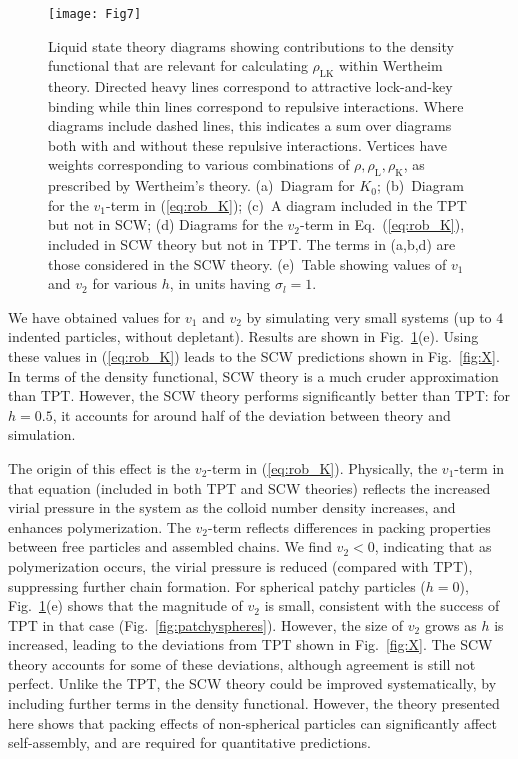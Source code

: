 \documentclass[10pt,onside,singlecolumn]{article}
\newcommand{\rhoL}{\rho_\mathrm{L}}
\newcommand{\rhoK}{\rho_\mathrm{K}}
\newcommand{\rhoLK}{\rho_\mathrm{LK}}
\begin{document}
\begin{figure} 
\texttt{[image: Fig7]}
  \caption{Liquid state theory diagrams showing contributions to the density functional that are
  relevant for calculating $\rhoLK$ within Wertheim theory. 
  Directed heavy lines correspond to attractive lock-and-key binding
  while thin lines correspond to repulsive interactions.  Where diagrams include
  dashed lines, this indicates a sum over diagrams both with and without these repulsive
  interactions.  Vertices have weights corresponding to various combinations of $\rho,\rhoL,\rhoK$,
  as prescribed by Wertheim's theory.
  (a)~Diagram for $K_0$; (b)~Diagram for the $v_1$-term in (\ref{eq:rob_K}); (c)~A diagram included
  in the TPT but not in SCW; (d) Diagrams for the $v_2$-term in Eq.~(\ref{eq:rob_K}), included in SCW theory but not in TPT.  
  The terms in (a,b,d) are those considered in the SCW theory.
  (e)~Table showing values
  of $v_1$ and $v_2$ for various $h$, in units having $\sigma_l=1$.}
  \label{fig:diagrams}
\end{figure}


We have obtained values for $v_1$ and $v_2$ by simulating very small systems (up to $4$ 
indented particles, without depletant).  Results are shown in Fig.~\ref{fig:diagrams}(e).  Using these
values in (\ref{eq:rob_K}) leads to the SCW predictions shown in Fig.~\ref{fig:X}.  In terms of the density functional,
SCW theory 
is a much cruder approximation than TPT.  However,
the SCW theory performs significantly better than TPT: for $h=0.5$, it accounts for around half of the deviation between theory
and simulation.  

The  origin of this effect is the $v_2$-term in (\ref{eq:rob_K}). Physically, the $v_1$-term in that equation 
(included in both TPT and SCW theories)
reflects the increased virial pressure in the system as the colloid number
density increases, and enhances polymerization.  
The $v_2$-term reflects differences in packing properties between free particles and assembled chains.  
We find $v_2<0$, indicating that as polymerization occurs, the virial pressure is reduced (compared with TPT), suppressing further chain formation.
For spherical patchy particles ($h=0$), 
Fig.~\ref{fig:diagrams}(e) shows that the magnitude of $v_2$ is small, consistent with the success of TPT in that case (Fig.~\ref{fig:patchyspheres}).
However, the size of $v_2$ grows as $h$ is increased, leading to the deviations from TPT shown in Fig.~\ref{fig:X}.  The
SCW theory accounts for some of these deviations, although agreement is still not perfect.  Unlike the TPT, the 
SCW theory could be improved systematically, 
by including further terms in the density functional.  However, the theory presented here shows 
that packing effects of non-spherical particles can significantly affect self-assembly, and are required for quantitative
predictions.
\end{document}
